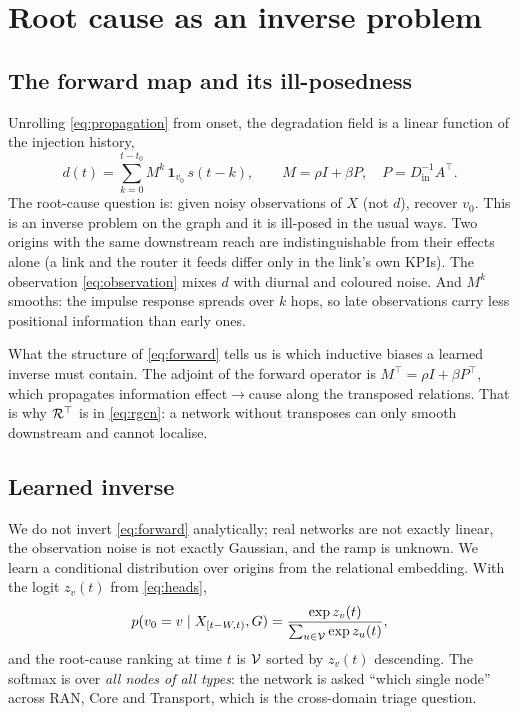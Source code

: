 \chapter{Root cause as an inverse problem}
\label{ch:inverse}

\section{The forward map and its ill-posedness}
Unrolling \eqref{eq:propagation} from onset, the degradation field is a linear function of the
injection history,
\begin{equation}
d(t)=\sum_{k=0}^{t-t_0}M^{k}\,\mathbf 1_{v_0}\,s(t-k),\qquad M=\rho I+\beta P,\quad P=D_{\mathrm{in}}^{-1}A^{\top}.
\label{eq:forward}
\end{equation}
The root-cause question is: given noisy observations of $X$ (not $d$), recover $v_0$. This is an
inverse problem on the graph and it is ill-posed in the usual ways. Two origins with the same
downstream reach are indistinguishable from their effects alone (a link and the router it feeds
differ only in the link's own KPIs). The observation \eqref{eq:observation} mixes $d$ with diurnal
and coloured noise. And $M^k$ smooths: the impulse response spreads over $k$ hops, so late
observations carry less positional information than early ones.

What the structure of \eqref{eq:forward} tells us is which inductive biases a learned inverse must
contain. The adjoint of the forward operator is $M^\top=\rho I+\beta P^\top$, which propagates
information effect$\to$cause along the transposed relations. That is why $\mathcal{R}^{\top}$ is in
\eqref{eq:rgcn}: a network without transposes can only smooth downstream and cannot localise.

\section{Learned inverse}
We do not invert \eqref{eq:forward} analytically; real networks are not exactly linear, the
observation noise is not exactly Gaussian, and the ramp is unknown. We learn a conditional
distribution over origins from the relational embedding. With the logit $z_v(t)$ from
\eqref{eq:heads},
\begin{equation}
p(v_0=v\mid X_{[t-W,t)},G)=\frac{\exp z_v(t)}{\sum_{u\in\mathcal{V}}\exp z_u(t)},
\label{eq:rca}
\end{equation}
and the root-cause ranking at time $t$ is $\mathcal{V}$ sorted by $z_v(t)$ descending. The softmax is over
\emph{all nodes of all types}: the network is asked ``which single node'' across RAN, Core and
Transport, which is the cross-domain triage question.

